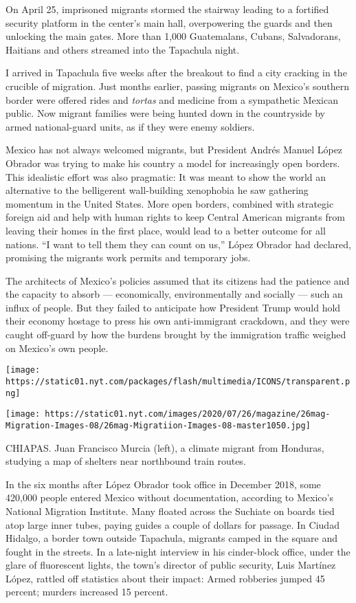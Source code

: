 On April 25, imprisoned migrants stormed the stairway leading to a
fortified security platform in the center's main hall, overpowering the
guards and then unlocking the main gates. More than 1,000 Guatemalans,
Cubans, Salvadorans, Haitians and others streamed into the Tapachula
night.

I arrived in Tapachula five weeks after the breakout to find a city
cracking in the crucible of migration. Just months earlier, passing
migrants on Mexico's southern border were offered rides and
\emph{tortas} and medicine from a sympathetic Mexican public. Now
migrant families were being hunted down in the countryside by armed
national-guard units, as if they were enemy soldiers.

Mexico has not always welcomed migrants, but President Andrés Manuel
López Obrador was trying to make his country a model for increasingly
open borders. This idealistic effort was also pragmatic: It was meant to
show the world an alternative to the belligerent wall-building
xenophobia he saw gathering momentum in the United States. More open
borders, combined with strategic foreign aid and help with human rights
to keep Central American migrants from leaving their homes in the first
place, would lead to a better outcome for all nations. ``I want to tell
them they can count on us,'' López Obrador had declared, promising the
migrants work permits and temporary jobs.

The architects of Mexico's policies assumed that its citizens had the
patience and the capacity to absorb --- economically, environmentally
and socially --- such an influx of people. But they failed to anticipate
how President Trump would hold their economy hostage to press his own
anti-immigrant crackdown, and they were caught off-guard by how the
burdens brought by the immigration traffic weighed on Mexico's own
people.

\texttt{[image: https://static01.nyt.com/packages/flash/multimedia/ICONS/transparent.png]}

\texttt{[image: https://static01.nyt.com/images/2020/07/26/magazine/26mag-Migration-Images-08/26mag-Migratiion-Images-08-master1050.jpg]}

CHIAPAS. Juan Francisco Murcia (left), a climate migrant from Honduras,
studying a map of shelters near northbound train routes.

In the six months after López Obrador took office in December 2018, some
420,000 people entered Mexico without documentation, according to
Mexico's National Migration Institute. Many floated across the Suchiate
on boards tied atop large inner tubes, paying guides a couple of dollars
for passage. In Ciudad Hidalgo, a border town outside Tapachula,
migrants camped in the square and fought in the streets. In a late-night
interview in his cinder-block office, under the glare of fluorescent
lights, the town's director of public security, Luis Martínez López,
rattled off statistics about their impact: Armed robberies jumped 45
percent; murders increased 15 percent.

